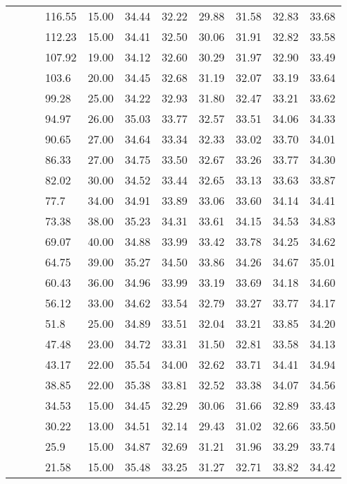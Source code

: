 \begin{longtable}{llllrrrrrrr}
   &  &  & 116.55 & 15.00 & 34.44 & 32.22 & 29.88 & 31.58 & 32.83 & 33.68 \\ 
   &  &  & 112.23 & 15.00 & 34.41 & 32.50 & 30.06 & 31.91 & 32.82 & 33.58 \\ 
   &  &  & 107.92 & 19.00 & 34.12 & 32.60 & 30.29 & 31.97 & 32.90 & 33.49 \\ 
   &  &  & 103.6 & 20.00 & 34.45 & 32.68 & 31.19 & 32.07 & 33.19 & 33.64 \\ 
   &  &  & 99.28 & 25.00 & 34.22 & 32.93 & 31.80 & 32.47 & 33.21 & 33.62 \\ 
   &  &  & 94.97 & 26.00 & 35.03 & 33.77 & 32.57 & 33.51 & 34.06 & 34.33 \\ 
   &  &  & 90.65 & 27.00 & 34.64 & 33.34 & 32.33 & 33.02 & 33.70 & 34.01 \\ 
   &  &  & 86.33 & 27.00 & 34.75 & 33.50 & 32.67 & 33.26 & 33.77 & 34.30 \\ 
   &  &  & 82.02 & 30.00 & 34.52 & 33.44 & 32.65 & 33.13 & 33.63 & 33.87 \\ 
   &  &  & 77.7 & 34.00 & 34.91 & 33.89 & 33.06 & 33.60 & 34.14 & 34.41 \\ 
   &  &  & 73.38 & 38.00 & 35.23 & 34.31 & 33.61 & 34.15 & 34.53 & 34.83 \\ 
   &  &  & 69.07 & 40.00 & 34.88 & 33.99 & 33.42 & 33.78 & 34.25 & 34.62 \\ 
   &  &  & 64.75 & 39.00 & 35.27 & 34.50 & 33.86 & 34.26 & 34.67 & 35.01 \\ 
   &  &  & 60.43 & 36.00 & 34.96 & 33.99 & 33.19 & 33.69 & 34.18 & 34.60 \\ 
   &  &  & 56.12 & 33.00 & 34.62 & 33.54 & 32.79 & 33.27 & 33.77 & 34.17 \\ 
   &  &  & 51.8 & 25.00 & 34.89 & 33.51 & 32.04 & 33.21 & 33.85 & 34.20 \\ 
   &  &  & 47.48 & 23.00 & 34.72 & 33.31 & 31.50 & 32.81 & 33.58 & 34.13 \\ 
   &  &  & 43.17 & 22.00 & 35.54 & 34.00 & 32.62 & 33.71 & 34.41 & 34.94 \\ 
   &  &  & 38.85 & 22.00 & 35.38 & 33.81 & 32.52 & 33.38 & 34.07 & 34.56 \\ 
   &  &  & 34.53 & 15.00 & 34.45 & 32.29 & 30.06 & 31.66 & 32.89 & 33.43 \\ 
   &  &  & 30.22 & 13.00 & 34.51 & 32.14 & 29.43 & 31.02 & 32.66 & 33.50 \\ 
   &  &  & 25.9 & 15.00 & 34.87 & 32.69 & 31.21 & 31.96 & 33.29 & 33.74 \\ 
   &  &  & 21.58 & 15.00 & 35.48 & 33.25 & 31.27 & 32.71 & 33.82 & 34.42 \\ 

\end{longtable}
